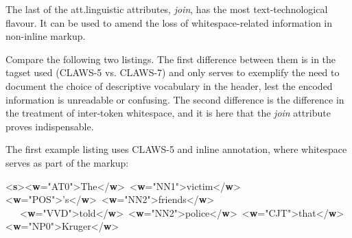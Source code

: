 The last of the att.linguistic attributes, {\itshape join}, has the most text-technological flavour. It can be used to amend the loss of whitespace-related information in non-inline markup.\par
Compare the following two listings. The first difference between them is in the tagset used (CLAWS-5 vs. CLAWS-7) and only serves to exemplify the need to document the choice of descriptive vocabulary in the header, lest the encoded information is unreadable or confusing. The second difference is the difference in the treatment of inter-token whitespace, and it is here that the {\itshape join} attribute proves indispensable.\par
The first example listing uses CLAWS-5 and inline annotation, where whitespace serves as part of the markup: \par\bgroup{}\exampleFont \begin{shaded}\noindent\mbox{}\newline
{<\textbf{s}>}{<\textbf{w}\hspace*{1em}{pos}="{AT0}">}The{</\textbf{w}>} {<\textbf{w}\hspace*{1em}{pos}="{NN1}">}victim{</\textbf{w}>}{<\textbf{w}\hspace*{1em}{pos}="{POS}">}'s{</\textbf{w}>} {<\textbf{w}\hspace*{1em}{pos}="{NN2}">}friends{</\textbf{w}>} \newline
   {<\textbf{w}\hspace*{1em}{pos}="{VVD}">}told{</\textbf{w}>} {<\textbf{w}\hspace*{1em}{pos}="{NN2}">}police{</\textbf{w}>} {<\textbf{w}\hspace*{1em}{pos}="{CJT}">}that{</\textbf{w}>} {<\textbf{w}\hspace*{1em}{pos}="{NP0}">}Kruger{</\textbf{w}>} \newline

\end{shaded}
